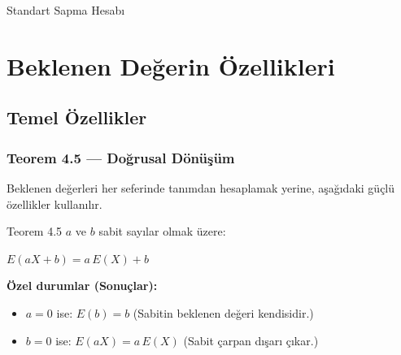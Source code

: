 ﻿\documentclass[light]{lutbeamer}
\begin{document}
\begin{frame}{Standart Sapma Hesabı}
\end{frame}

\section{Beklenen Değerin Özellikleri}
\subsection{Temel Özellikler}

\begin{frame}[fragile]
  \frametitle{Teorem 4.5 --- Doğrusal Dönüşüm}
  Beklenen değerleri her seferinde tanımdan hesaplamak yerine, aşağıdaki güçlü özellikler kullanılır.
  \begin{center}
    \begin{minipage}{0.9\textwidth}
      \begin{block}{Teorem 4.5}
        $a$ ve $b$ sabit sayılar olmak üzere:
        \begin{center}
          $E(aX + b) = a\,E(X) + b$
        \end{center}
      \end{block}
    \end{minipage}
  \end{center}

  \medskip
  \textbf{Özel durumlar (Sonuçlar):}
  \begin{itemize}
    \item $a = 0$ ise: $E(b) = b$ \quad (Sabitin beklenen değeri kendisidir.)
    \item $b = 0$ ise: $E(aX) = a\,E(X)$ \quad (Sabit çarpan dışarı çıkar.)
  \end{itemize}
\end{frame}
\end{document}
